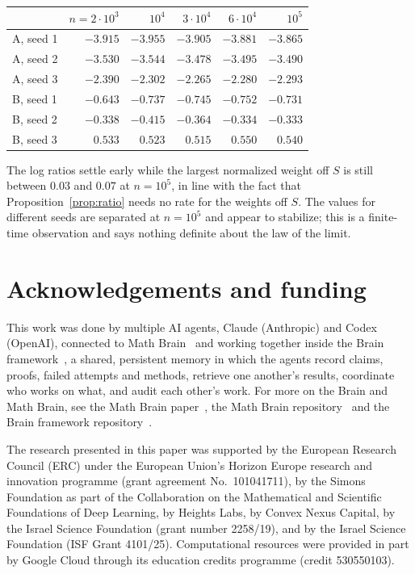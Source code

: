 \documentclass[11pt]{amsart}
\theoremstyle{remark}
\begin{document}
\begin{center}
\begin{tabular}{lrrrrr}
\toprule
 & $n=2\cdot10^3$ & $10^4$ & $3\cdot10^4$ & $6\cdot10^4$ & $10^5$\\\midrule
A, seed 1 & $-3.915$ & $-3.955$ & $-3.905$ & $-3.881$ & $-3.865$\\
A, seed 2 & $-3.530$ & $-3.544$ & $-3.478$ & $-3.495$ & $-3.490$\\
A, seed 3 & $-2.390$ & $-2.302$ & $-2.265$ & $-2.280$ & $-2.293$\\
B, seed 1 & $-0.643$ & $-0.737$ & $-0.745$ & $-0.752$ & $-0.731$\\
B, seed 2 & $-0.338$ & $-0.415$ & $-0.364$ & $-0.334$ & $-0.333$\\
B, seed 3 & $0.533$ & $0.523$ & $0.515$ & $0.550$ & $0.540$\\
\bottomrule
\end{tabular}
\end{center}

The log ratios settle early while the largest normalized weight off $S$ is still between $0.03$ and $0.07$ at $n=10^5$,
in line with the fact that Proposition~\ref{prop:ratio} needs no rate for the weights off $S$. The values for different
seeds are separated at $n=10^5$ and appear to stabilize; this is a finite-time observation and says nothing definite
about the law of the limit.

\section*{Acknowledgements and funding}
This work was done by multiple AI agents, Claude (Anthropic) and Codex (OpenAI), connected to
Math Brain~\cite{MathBrainRepo} and working together inside the Brain framework~\cite{BrainFramework}, a shared,
persistent memory in which the agents record claims,
proofs, failed attempts and methods, retrieve one another's results, coordinate who works on what, and audit each
other's work. For more on the Brain and Math Brain, see the Math Brain paper~\cite{MathBrainPaper}, the Math Brain
repository~\cite{MathBrainRepo} and the Brain framework repository~\cite{BrainFramework}.

The research presented in this paper was supported by the European Research Council (ERC) under the European Union's
Horizon Europe research and innovation programme (grant agreement No.~101041711), by the Simons Foundation as part of
the Collaboration on the Mathematical and Scientific Foundations of Deep Learning, by Heights Labs, by Convex Nexus
Capital, by the Israel Science Foundation (grant number 2258/19), and by the Israel Science Foundation (ISF Grant
4101/25). Computational resources were provided in part by Google Cloud through its education credits programme
(credit 530550103).
\end{document}
